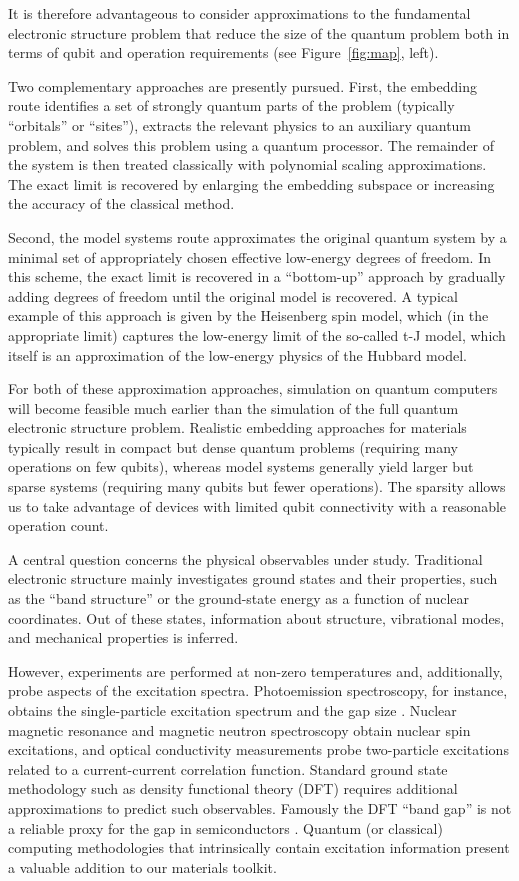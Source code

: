 It is therefore advantageous to consider approximations to the fundamental electronic structure problem that reduce the size of the quantum problem both in terms of qubit and operation requirements (see Figure~\ref{fig:map}, left).

Two complementary approaches are presently pursued. First, the embedding route identifies a set of strongly quantum parts of the problem (typically ``orbitals'' or ``sites''), extracts the relevant physics to an auxiliary quantum problem, and solves this problem using a quantum processor. The remainder of the system is then treated classically with polynomial scaling approximations. The exact limit is recovered by enlarging the embedding subspace or increasing the accuracy of the classical method.

Second, the model systems route approximates the original quantum system by a minimal set of appropriately chosen effective low-energy degrees of freedom. In this scheme, the exact limit is recovered in a ``bottom-up'' approach by gradually adding degrees of freedom until the original model is recovered. A typical example of this approach is given by the Heisenberg spin model, which (in the appropriate limit) captures the low-energy limit of the so-called t-J model, which itself is an approximation of the low-energy physics of the Hubbard model.

For both of these approximation approaches, simulation on quantum computers will become feasible much earlier than the simulation of the full quantum electronic structure problem. Realistic embedding approaches for materials typically result in compact but dense quantum problems (requiring many operations on few qubits), whereas model systems generally yield larger but sparse systems (requiring many qubits but fewer operations). The sparsity allows us to take advantage of devices with limited qubit connectivity with a reasonable operation count.

A central question concerns the physical observables under study. Traditional electronic structure mainly investigates ground states and their properties, such as the ``band structure'' or the ground-state energy as a function of nuclear coordinates. Out of these states, information about structure, vibrational modes, and mechanical properties is inferred.

However, experiments are performed at non-zero temperatures and, additionally, probe aspects of the excitation spectra. Photoemission spectroscopy, for instance, obtains the single-particle excitation spectrum and the gap size \cite{10.1063/5.0044060}. Nuclear magnetic resonance and magnetic neutron spectroscopy obtain nuclear spin excitations, and optical conductivity measurements probe two-particle excitations related to a current-current correlation function. Standard ground state methodology such as density functional theory (DFT) requires additional approximations to predict such observables. Famously the DFT ``band gap'' is not a reliable proxy for the gap in semiconductors \cite{bandgap,perdew1985density,cohen2012challenges}.
Quantum (or classical) computing methodologies that intrinsically contain excitation information present a valuable addition to our materials toolkit.

